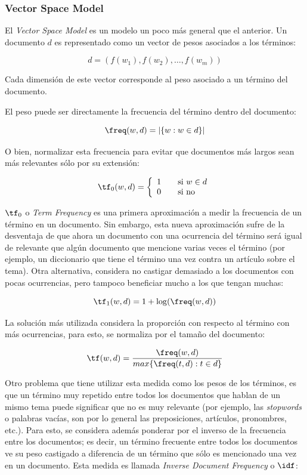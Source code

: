 \documentclass[upright, contnum]{umemoria}
\begin{document}
    \subsubsection{Vector Space Model}

    El \emph{Vector Space Model} es un modelo un poco más general que el
    anterior. Un documento $d$ es representado como un vector de pesos
    asociados a los términos:

    $$d = (f(w_1), f(w_2), \ldots, f(w_m))$$

    Cada dimensión de este vector corresponde al peso asociado a un
    término del documento. 

    El peso puede ser directamente la frecuencia del término dentro
    del documento:

    $$\freq(w,d) = |\{w : w \in d\}|$$

    O bien, normalizar esta frecuencia para evitar que documentos más
    largos sean más relevantes sólo por su extensión:

    $$\tf_0(w,d) = \left\{ 
    \begin{array}{l l}
    1 & \quad \textrm{si $w \in d$}\\
    0 & \quad \textrm{si no}\\
    \end{array} \right.$$

    $\tf_0$ o \emph{Term Frequency} es una primera aproximación a medir la
    frecuencia de un término en un documento. Sin embargo, esta nueva
    aproximación sufre de la desventaja de que ahora un documento con
    una ocurrencia del término será igual de relevante que algún
    documento que mencione varias veces el término (por ejemplo, un
    diccionario que tiene el término una vez contra un artículo sobre
    el tema). Otra alternativa, considera no castigar demasiado a los
    documentos con pocas ocurrencias, pero tampoco beneficiar mucho a
    los que tengan muchas:

    $$\tf_1(w,d) = 1 + \log(\freq(w,d))$$

    La solución más utilizada considera la proporción con respecto al
    término con más ocurrencias, para esto, se normaliza por el tamaño
    del documento:

    $$\tf(w,d) = \frac{\freq(w,d)}{max\{\freq(t,d) : t \in d\}}$$

    Otro problema que tiene utilizar esta medida como los pesos de los
    términos, es que un término muy repetido entre todos los
    documentos que hablan de un mismo tema puede significar que no es
    muy relevante (por ejemplo, las \emph{stopwords} o palabras vacías, son
    por lo general las preposiciones, artículos, pronombres,
    etc.). Para esto, se considera además ponderar por el inverso de
    la frecuencia entre los documentos; es decir, un término frecuente
    entre todos los documentos ve su peso castigado a diferencia de un
    término que sólo es mencionado una vez en un documento. Esta
    medida es llamada \emph{Inverse Document Frequency} o $\idf$:
\end{document}

